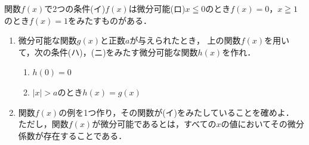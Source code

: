 \documentclass[../../main.tex]{subfiles}
\begin{document}
関数$f(x)$で2つの条件(イ)$f(x)$は微分可能(ロ)$x\leqq0$のとき$f(x)=0$，$x\geqq1$のとき$f(x)=1$をみたすものがある．
\begin{enumerate}
  \item[(i)] 微分可能な関数$g(x)$と正数$a$が与えられたとき，
    上の関数$f(x)$を用いて，次の条件(ハ)，(ニ)をみたす微分可能な関数$h(x)$を作れ．
    \begin{enumerate}
      \item[(ハ)] $h(0)=0$
      \item[(ニ)] $|x|>a$のとき$h(x)=g(x)$
    \end{enumerate}
  \item[(ii)] 関数$f(x)$の例を1つ作り，その関数が(イ)をみたしていることを確めよ．
    ただし，関数$f(x)$が微分可能であるとは，すべての$x$の値においてその微分係数が存在することである．
\end{enumerate}
\end{document}
